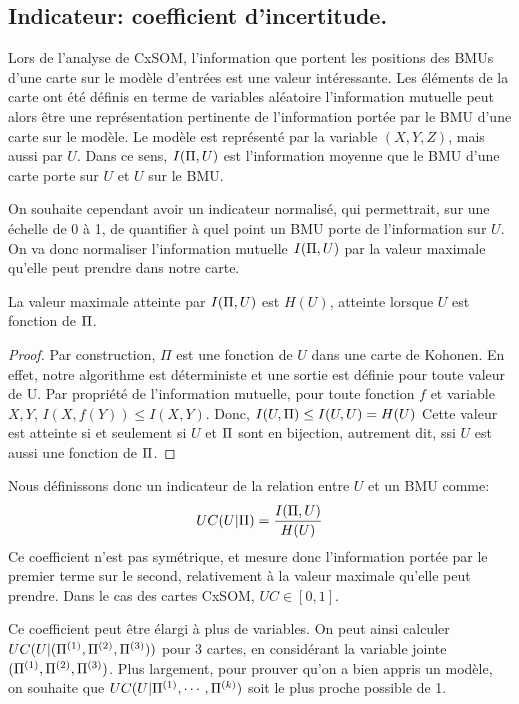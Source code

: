 \subsection{Indicateur: coefficient d'incertitude.}

Lors de l'analyse de CxSOM, l'information que portent les positions des BMUs d'une carte sur le modèle d'entrées est une valeur intéressante. Les éléments de la carte ont été définis en terme de variables aléatoire l'information mutuelle peut alors être une représentation pertinente de l'information portée par le BMU d'une carte sur le modèle. Le modèle est représenté par la variable $(X,Y,Z)$, mais aussi par $U$. Dans ce sens, $I(\Pi, U)$ est l'information moyenne que le BMU d'une carte porte sur $U$ et $U$ sur le BMU.

On souhaite cependant avoir un indicateur normalisé, qui permettrait, sur une échelle de 0 à 1, de quantifier à quel point un BMU porte de l'information sur $U$. On va donc normaliser l'information mutuelle $I(\Pi,U)$ par la valeur maximale qu'elle peut prendre dans notre carte.

\begin{propriete}
La valeur maximale atteinte par $I(\Pi,U)$ est $H(U)$, atteinte lorsque $U$ est fonction de $\Pi$.
\end{propriete}

\begin{proof}
Par construction, $\Pi$ est une fonction de $U$ dans une carte de Kohonen. En effet, notre algorithme est déterministe et une sortie est définie pour toute valeur de U. 
Par propriété de l'information mutuelle, pour toute fonction $f$ et variable $X,Y$, $I(X,f(Y)) \leq I(X,Y) $.
Donc, $I(U,\Pi) \leq I(U,U) = H(U)$
Cette valeur est atteinte si et seulement si $U$ et $\Pi$ sont en bijection, autrement dit, ssi $U$ est aussi une fonction de $\Pi$.

\end{proof}

Nous définissons donc un indicateur de la relation entre $U$ et un BMU comme:
\begin{equation}
UC(U|\Pi) = \frac{I(\Pi,U)}{H(U)}
\end{equation}
Ce coefficient n'est pas symétrique, et mesure donc l'information portée par le premier terme sur le second, relativement à la valeur maximale qu'elle peut prendre. Dans le cas des cartes CxSOM, $UC \in [0,1]$. 

Ce coefficient peut être élargi à plus de variables. On peut ainsi calculer $UC(U | (\Pi^{({1})},\Pi^{({2})},\Pi^{({3})}))$ pour 3 cartes, en considérant la variable jointe $(\Pi^{({1})},\Pi^{({2})},\Pi^{({3})})$. Plus largement, pour prouver qu'on a bien appris un modèle, on souhaite que $UC(U|\Pi^{({1})},\cdots,\Pi^{({k})})$ soit le plus proche possible de 1.

